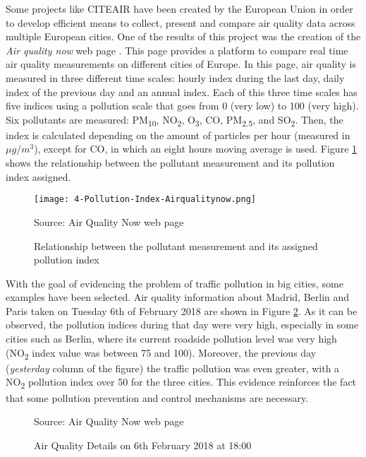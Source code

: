 Some projects like \ac{CITEAIR} have been created by the European Union \cite{citeair} in order to develop efficient means to collect, present and compare air quality data across multiple European cities. One of the results of this project was the creation of the \emph{Air quality now} web page \cite{airqualitynow}. This page provides a platform to compare real time air quality measurements on different cities of Europe. In this page, air quality is measured in three different time scales: hourly index during the last day, daily index of the previous day and an annual index. Each of this three time scales has five indices using a pollution scale that goes from 0 (very low) to 100 (very high). Six pollutants are measured: PM\textsubscript{10}, NO\textsubscript{2}, O\textsubscript{3}, CO, PM\textsubscript{2.5}, and SO\textsubscript{2}. Then, the index is calculated depending on the amount of particles per hour (measured in $\mu g/m^3$), except for CO, in which an eight hours moving average is used. Figure \ref{fig:4-Pollution-Index-Airqualitynow} shows the relationship between the pollutant measurement and its pollution index assigned.

\begin{figure}[!h]
	\begin{center}
		\texttt{[image: 4-Pollution-Index-Airqualitynow.png]}	
		\caption{Relationship between the pollutant measurement and its assigned pollution index}{Source: Air Quality Now web page \cite{airqualitynow}}
		\label{fig:4-Pollution-Index-Airqualitynow}
	\end{center}
\end{figure}

With the goal of evidencing the problem of traffic pollution in big cities, some examples have been selected. Air quality information about Madrid, Berlin and Paris taken on Tuesday 6th of February 2018 are shown in Figure \ref{fig:4-AirQuality-Details}.
As it can be observed, the pollution indices during that day were very high, especially in some cities such as Berlin, where its current roadside pollution level was very high (NO\textsubscript{2} index value was between 75 and 100). Moreover, the previous day (\textit{yesterday} column of the figure) the traffic pollution was even greater, with a NO\textsubscript{2} pollution index over 50 for the three cities. This evidence reinforces the fact that some pollution prevention and control mechanisms are necessary.

\begin{figure}[!htbp]
	\centering
	\caption{Air Quality Details on 6th February 2018 at 18:00}
	\label{fig:4-AirQuality-Details}{Source: Air Quality Now web page \cite{airqualitynow}}
\end{figure}


